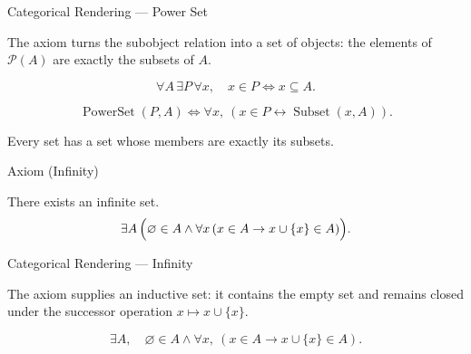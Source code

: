 \begin{lracategoricalcard}{Categorical Rendering --- Power Set}
\begin{center}

\end{center}
\smallskip
\noindent\footnotesize
The axiom turns the subobject relation into a set of objects: the elements of
\(\mathcal P(A)\) are exactly the subsets of \(A\).
\end{lracategoricalcard}

\begin{remark*}
\[
  \forall A\,\exists P\,\forall x,\quad
  x\in P \iff x\subseteq A.
\]
\end{remark*}

\begin{remark*}
\[
  \operatorname{PowerSet}(P,A)
  \iff
  \forall x,\ (x\in P\leftrightarrow \operatorname{Subset}(x,A)).
\]
\end{remark*}

\begin{remark*}[Interpretation]
Every set has a set whose members are exactly its subsets.
\end{remark*}

\NoLocalDependencies

\begin{axiombox}{Axiom (Infinity)}
\begin{axiom}
\label{ax:infinity}
There exists an infinite set.
\[
\exists A \,
\Bigl( \varnothing \in A \land
\forall x \, (x \in A \rightarrow x \cup \{x\} \in A) \Bigr).
\]
\end{axiom}
\end{axiombox}

\begin{lracategoricalcard}{Categorical Rendering --- Infinity}
\begin{center}

\end{center}
\smallskip
\noindent\footnotesize
The axiom supplies an inductive set: it contains the empty set and remains
closed under the successor operation \(x\mapsto x\cup\{x\}\).
\end{lracategoricalcard}

\begin{remark*}
\[
  \exists A,\quad
  \varnothing\in A\wedge
  \forall x,\ (x\in A\to x\cup\{x\}\in A).
\]
\end{remark*}

